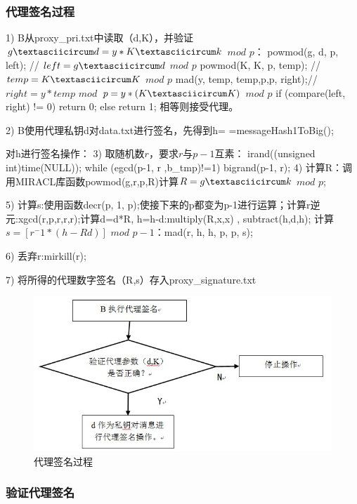\subsubsection{代理签名过程}

1)   B从proxy\_pri.txt中读取（d,K），并验证$g\textasciicircum d=y*K\textasciicircum k$ $mod$ $p$：
powmod(g, d, p, left); // $left = g\textasciicircum d$ $mod$ $p$  
powmod(K, K, p, temp); // $temp = K\textasciicircum K$ $mod$ $p$
mad(y, temp, temp,p,p, right);// $right = y*temp$ $mod$ $p = y*(K\textasciicircum K)$ $mod$ $p$
if (compare(left, right) != 0) return 0; else return 1;
     相等则接受代理。

2)  B使用代理私钥d对data.txt进行签名，先得到h= =messageHash1ToBig();

对h进行签名操作：
3)  取随机数$r$，要求$r$与$p-1$互素：
    irand((unsigned int)time(NULL));
    while (egcd(p-1, r ,b\_tmp)!=1) {bigrand(p-1, r);}
4)  计算R：调用MIRACL库函数powmod(g,r,p,R)计算$R=g\textasciicircum k$ $mod$ $p$;

5)  计算s:使用函数decr(p, 1, p);使接下来的p都变为p-1进行运算\cite{基于离散对数问题的代理数字签名}；计算r逆元:xgcd(r,p,r,r,r);计算d=d*R,   h=h-d:multiply(R,x,x) , subtract(h,d,h); 计算$s=[r^-1*(h-Rd)]$ $mod$ $p-1$：mad(r, h, h, p, p, s);\cite{基于ELGamal体制的代理签名}

6)  丢弃r:mirkill(r);

7)  将所得的代理数字签名（R,s）存入proxy\_signature.txt

\begin{figure}[H]
\centering
\includegraphics{img/6.jpg}
\caption{代理签名过程}
\end{figure}

\subsubsection{验证代理签名}

